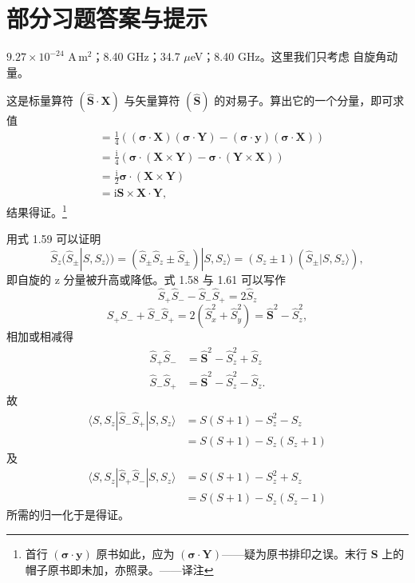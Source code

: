 \chapter{部分习题答案与提示}

 $9.27\times10^{-24}$ A\,m$^{2}$；8.40 GHz；34.7 $\mu$eV；8.40 GHz。这里我们只考虑
自旋角动量。

 这是标量算符 $(\hat{\mathbf{S}}\cdot\mathbf{X})$ 与矢量算符
$(\hat{\mathbf{S}})$ 的对易子。算出它的一个分量，即可求值
\begin{align*}
[\hat{\mathbf{S}}\cdot\mathbf{X}, \hat{\mathbf{S}}\cdot\mathbf{Y}] &= \frac{1}{4}\left((\boldsymbol{\sigma}\cdot\mathbf{X})(\boldsymbol{\sigma}\cdot\mathbf{Y}) - (\boldsymbol{\sigma}\cdot\mathbf{y}) (\boldsymbol{\sigma}\cdot\mathbf{X})\right)\\
&= \frac{\mathrm{i}}{4}\left(\boldsymbol{\sigma}\cdot(\mathbf{X}\times\mathbf{Y}) - \boldsymbol{\sigma}\cdot(\mathbf{Y}\times\mathbf{X})\right)\\
&= \frac{\mathrm{i}}{2}\boldsymbol{\sigma}\cdot(\mathbf{X}\times\mathbf{Y})\\
&= \mathrm{i}\mathbf{S}\times\mathbf{X}\cdot\mathbf{Y},\tag{F.1}
\end{align*}
结果得证。\footnote{首行 $(\boldsymbol{\sigma}\cdot\mathbf{y})$ 原书如此，应为
$(\boldsymbol{\sigma}\cdot\mathbf{Y})$——疑为原书排印之误。末行 $\mathbf{S}$ 上的
帽子原书即未加，亦照录。——译注}

 用式 1.59 可以证明
\begin{equation*}
\hat{S}_z(\hat{S}_{\pm}|S, S_z\rangle) = (\hat{S}_{\pm}\hat{S}_z \pm \hat{S}_{\pm})|S, S_z\rangle = (S_z\pm1)(\hat{S}_{\pm}|S, S_z\rangle),\tag{F.2}
\end{equation*}
即自旋的 z 分量被升高或降低。式 1.58 与 1.61 可以写作
\begin{equation*}
\hat{S}_{+}\hat{S}_{-} - \hat{S}_{-}\hat{S}_{+} = 2\hat{S}_z\tag{F.3}
\end{equation*}
\begin{equation*}
\hat{S}_{+}\hat{S}_{-} + \hat{S}_{-}\hat{S}_{+} = 2(\hat{S}_x^{2}+\hat{S}_y^{2}) = \hat{\mathbf{S}}^{2}-\hat{S}_z^{2},\tag{F.4}
\end{equation*}
相加或相减得
\begin{align*}
\hat{S}_{+}\hat{S}_{-} &= \hat{\mathbf{S}}^{2}-\hat{S}_z^{2}+\hat{S}_z\tag{F.5}\\
\hat{S}_{-}\hat{S}_{+} &= \hat{\mathbf{S}}^{2}-\hat{S}_z^{2}-\hat{S}_z.\tag{F.6}
\end{align*}
故
\begin{align*}
\langle S, S_z|\hat{S}_{-}\hat{S}_{+}|S, S_z\rangle &= S(S+1)-S_z^{2}-S_z\\
&= S(S+1)-S_z(S_z+1)\tag{F.7}
\end{align*}
及
\begin{align*}
\langle S, S_z|\hat{S}_{+}\hat{S}_{-}|S, S_z\rangle &= S(S+1)-S_z^{2}+S_z\\
&= S(S+1)-S_z(S_z-1)\tag{F.8}
\end{align*}
所需的归一化于是得证。

